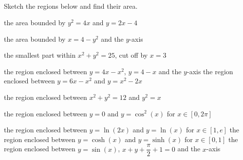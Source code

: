 \renewcommand{\ExerciseListName}{Assignement}

\subsection*{}
\begin{Exercise} Sketch the regions below and find their area.

\Question[difficulty = 1] the area bounded by $y^2=4x$ and $y=2x-4$

\Question[difficulty = 1] the area bounded by $x=4-y^2$ and the $y$-axis

\Question[difficulty = 1] the smallest part within $x^2 + y^2=25$, cut off by $x=3$

\ifcalculus \Question[difficulty = 2] \fi  \ifanalysis \Question[difficulty = 1] \fi the region enclosed between $y=4x-x^2$, $y=4-x$ and the $y$-axis
\ifcalculus \Question[difficulty = 2] \fi \ifanalysis \Question[difficulty = 1] \fi the region enclosed between $y=6x-x^2$ and $y=x^2-2x$

\ifanalysis\Question[difficulty = 1]\fi \ifcalculus\Question[difficulty = 2]\fi the region enclosed between $x^2 + y^2=12$ and $y^2=x$

\ifanalysis\Question[difficulty = 1]\fi \ifcalculus\Question[difficulty = 2]\fi the region enclosed between $y=0$ and $y= \cos^2(x)$ for $x \in [0,2\pi]$

\ifanalysis \Question[difficulty = 1] \fi \ifcalculus\Question[difficulty = 2]\fi the region enclosed between $y=\ln (2x)$ and $y= \ln(x)$ for $x \in [1,e]$ 
\ifanalysis
\Question[difficulty = 1] the region enclosed between $y=\cosh (x)$ and $y= \sinh (x)$ for $x \in [0,1]$  
\fi
\ifanalysis\Question[difficulty = 2]\fi \ifcalculus\Question[difficulty = 3]\fi the region enclosed between $y = \sin (x)$, $x+y+\dfrac{\pi}{2} + 1 = 0$ and the $x$-axis

\end{Exercise}

